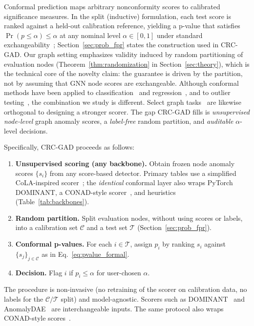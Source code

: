 \documentclass[a4paper]{cas-dc}
\theoremstyle{definition}
\begin{document}
Conformal prediction maps arbitrary nonconformity scores to calibrated significance measures.
In the split (inductive) formulation, each test score is ranked against a held-out calibration reference, yielding a p-value that satisfies $\Pr(p \leq \alpha) \leq \alpha$ at any nominal level $\alpha \in [0,1]$ under standard exchangeability~\cite{angelopoulos2023conformal}; Section~\ref{sec:prob_fpr} states the construction used in CRC-GAD.
Our graph setting emphasizes validity induced by random partitioning of evaluation nodes (Theorem~\ref{thm:randomization} in Section~\ref{sec:theory}), which is the technical core of the novelty claim: the guarantee is driven by the partition, not by assuming that GNN node scores are exchangeable.
Although conformal methods have been applied to classification~\cite{romano2020classification} and regression~\cite{romano2019conformalized}, and to outlier testing~\cite{bates2023testing}, the combination we study is different.
Select graph tasks~\cite{huang2024uncertainty,liu2024conformal} are likewise orthogonal to designing a stronger scorer.
The gap CRC-GAD fills is \emph{unsupervised node-level} graph anomaly scores, a \emph{label-free} random partition, and \emph{auditable} $\alpha$-level decisions.

Specifically, CRC-GAD proceeds as follows:
\begin{enumerate}
  \item \textbf{Unsupervised scoring (any backbone).} Obtain frozen node anomaly scores $\{s_i\}$ from any score-based detector. Primary tables use a simplified CoLA-inspired scorer~\cite{liu2022cola}; the \emph{identical} conformal layer also wraps PyTorch DOMINANT, a CONAD-style scorer~\cite{xu2022conad}, and heuristics (Table~\ref{tab:backbones}).
  \item \textbf{Random partition.} Split evaluation nodes, without using scores or labels, into a calibration set $\mathcal{C}$ and a test set $\mathcal{T}$ (Section~\ref{sec:prob_fpr}).
  \item \textbf{Conformal p-values.} For each $i \in \mathcal{T}$, assign $p_i$ by ranking $s_i$ against $\{s_j\}_{j \in \mathcal{C}}$ as in Eq.~\eqref{eq:pvalue_formal}.
  \item \textbf{Decision.} Flag $i$ if $p_i \leq \alpha$ for user-chosen $\alpha$.
\end{enumerate}
The procedure is non-invasive (no retraining of the scorer on calibration data, no labels for the $\mathcal{C}/\mathcal{T}$ split) and model-agnostic.
Scorers such as DOMINANT~\cite{ding2019dominant} and AnomalyDAE~\cite{fan2020anomalydae} are interchangeable inputs.
The same protocol also wraps CONAD-style scores~\cite{xu2022conad}.
\end{document}
